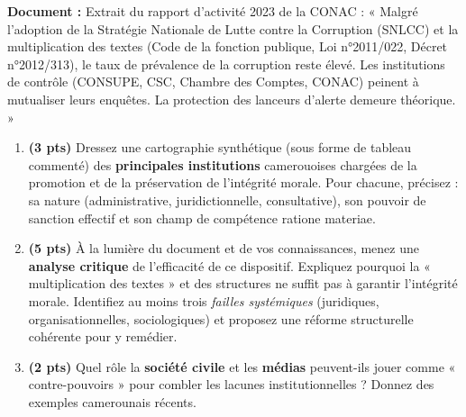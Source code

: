 \documentclass[11pt]{article}
\begin{document}
\begin{exercice}
\textbf{Document :} Extrait du rapport d'activité 2023 de la CONAC : « Malgré l'adoption de la Stratégie Nationale de Lutte contre la Corruption (SNLCC) et la multiplication des textes (Code de la fonction publique, Loi n°2011/022, Décret n°2012/313), le taux de prévalence de la corruption reste élevé. Les institutions de contrôle (CONSUPE, CSC, Chambre des Comptes, CONAC) peinent à mutualiser leurs enquêtes. La protection des lanceurs d'alerte demeure théorique. »

\begin{enumerate}
    \item \textbf{(3 pts)} Dressez une cartographie synthétique (sous forme de tableau commenté) des \textbf{principales institutions} camerouoises chargées de la promotion et de la préservation de l'intégrité morale. Pour chacune, précisez : sa nature (administrative, juridictionnelle, consultative), son pouvoir de sanction effectif et son champ de compétence ratione materiae.
    \item \textbf{(5 pts)} À la lumière du document et de vos connaissances, menez une \textbf{analyse critique} de l'efficacité de ce dispositif. Expliquez pourquoi la « multiplication des textes » et des structures ne suffit pas à garantir l'intégrité morale. Identifiez au moins trois \textit{failles systémiques} (juridiques, organisationnelles, sociologiques) et proposez une réforme structurelle cohérente pour y remédier.
    \item \textbf{(2 pts)} Quel rôle la \textbf{société civile} et les \textbf{médias} peuvent-ils jouer comme « contre-pouvoirs » pour combler les lacunes institutionnelles ? Donnez des exemples camerounais récents.
\end{enumerate}
\end{exercice}
\end{document}
